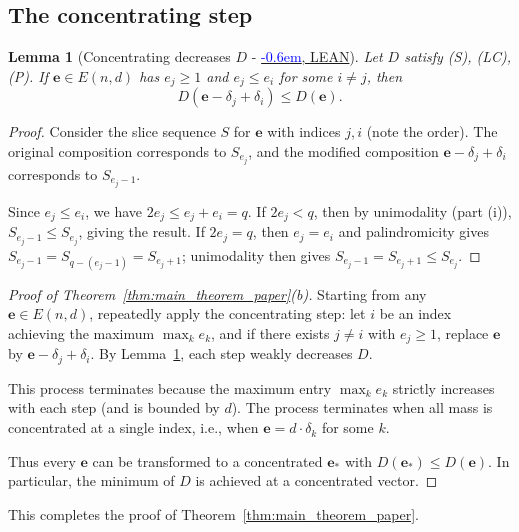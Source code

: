 \documentclass[12pt,reqno]{amsart}
\newtheorem{lemma}[theorem]{Lemma}
\theoremstyle{definition}
\newcommand\doublecheck{\textcolor{blue}{\checked\kern-0.6em\checked}}
\newcommand{\ee}{\mathbf{e}}
\begin{document}
\begin{aiparagraph}
\subsection{The concentrating step} \label{sect:concentration}

\begin{lemma}[Concentrating decreases $D$ - \href{https://schmittj.github.io/balanced-vectors-blueprint/docs/BalancedVectors.html\#concentrating_decreases_D}{\doublecheck, LEAN}]\label{lem:concentrating_decreases_D}
Let $D$ satisfy \textup{(S)}, \textup{(LC)}, \textup{(P)}. If $\ee \in E(n,d)$ has $e_j \geq 1$ and $e_j \leq e_i$ for some $i \neq j$, then
\[
D(\ee - \delta_j + \delta_i) \leq D(\ee).
\]
\end{lemma}

\begin{proof}
Consider the slice sequence $S$ for $\ee$ with indices $j, i$ (note the order). The original composition corresponds to $S_{e_j}$, and the modified composition $\ee - \delta_j + \delta_i$ corresponds to $S_{e_j - 1}$.

Since $e_j \leq e_i$, we have $2e_j \leq e_j + e_i = q$. If $2e_j < q$, then by unimodality (part (i)), $S_{e_j - 1} \leq S_{e_j}$, giving the result. If $2e_j = q$, then $e_j = e_i$ and palindromicity gives $S_{e_j - 1} = S_{q - (e_j - 1)} = S_{e_j + 1}$; unimodality then gives $S_{e_j - 1} = S_{e_j + 1} \leq S_{e_j}$.
\end{proof}

\begin{proof}[Proof of Theorem~\ref{thm:main_theorem_paper}(b)]
Starting from any $\ee \in E(n,d)$, repeatedly apply the concentrating step: let $i$ be an index achieving the maximum $\max_k e_k$, and if there exists $j \neq i$ with $e_j \geq 1$, replace $\ee$ by $\ee - \delta_j + \delta_i$. By Lemma~\ref{lem:concentrating_decreases_D}, each step weakly decreases $D$.

This process terminates because the maximum entry $\max_k e_k$ strictly increases with each step (and is bounded by $d$). The process terminates when all mass is concentrated at a single index, i.e., when $\ee = d \cdot \delta_k$ for some $k$.

Thus every $\ee$ can be transformed to a concentrated $\ee_*$ with $D(\ee_*) \leq D(\ee)$. In particular, the minimum of $D$ is achieved at a concentrated vector.
\end{proof}

This completes the proof of Theorem~\ref{thm:main_theorem_paper}.
\end{aiparagraph}
\end{document}
